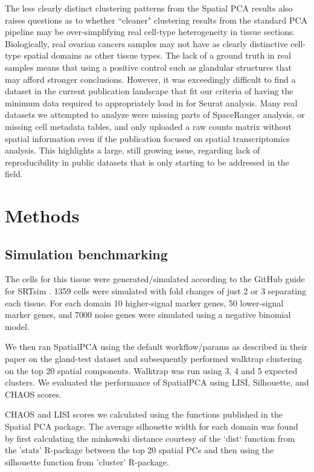 \documentclass{article}
\begin{document}
The less clearly distinct clustering patterns from the Spatial PCA results also raises questions as to whether ``cleaner" clustering results from the standard PCA pipeline may be over-simplifying real cell-type heterogeneity in tissue sections. Biologically, real ovarian cancers samples may not have as clearly distinctive cell-type spatial domains as other tissue types. The lack of a ground truth in real samples means that using a positive control such as glandular structures that may afford stronger conclusions. However, it was exceedingly difficult to find a dataset in the current publication landscape that fit our criteria of having the minimum data required to appropriately load in for Seurat analysis. Many real datasets we attempted to analyze were missing parts of SpaceRanger analysis, or missing cell metadata tables, and only uploaded a raw counts matrix without spatial information even if the publication focused on spatial transcriptomics analysis. This highlights a large, still growing issue, regarding lack of reproducibility in public datasets that is only starting to be addressed in the field\citep{fullgrabe_guidelines_2020}.

\section*{Methods}

\subsection*{Simulation benchmarking}

The cells for this tissue were generated/simulated according to the GitHub guide for SRTsim \citep{SRTsim_vig}. 1359 cells were simulated with fold changes of just 2 or 3 separating each tissue. For each domain 10 higher-signal marker genes, 50 lower-signal marker genes, and 7000 noise genes were simulated using a negative binomial model. 

We then ran SpatialPCA using the default workflow/params as described in their paper on the gland-test dataset and subsequently performed walktrap clustering on the top 20 spatial components. Walktrap was run using 3, 4 and 5 expected clusters. We evaluated the performance of SpatialPCA using LISI, Silhouette, and CHAOS scores.

CHAOS and LISI scores we calculated using the functions published in the Spatial PCA package. The average silhouette width for each domain was found by first calculating the minkowski distance courtesy of the `dist` function from the 'stats' R-package between the top 20 spatial PCs and then using the silhouette function from 'cluster' R-package. 
\end{document}
